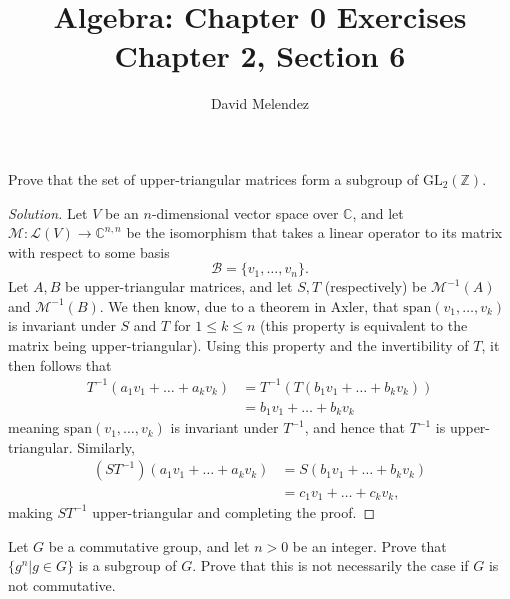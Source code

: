 \documentclass[12pt]{article}
\newenvironment{problem}[2][Problem]{\begin{trivlist}
\item[\hskip \labelsep {\bfseries #1}\hskip \labelsep {\bfseries #2.}]}{\end{trivlist}}
\newenvironment{solution}
  {\renewcommand\qedsymbol{$\blacksquare$}\begin{proof}[Solution]}
{\end{proof}}
\begin{document}
\title{Algebra: Chapter 0 Exercises\\ \large Chapter 2, Section 6}
\author{David Melendez}
\maketitle

\begin{problem}{6.2}
  Prove that the set of upper-triangular matrices form a subgroup of $\text{GL}_2(\mathbb{Z})$.
\end{problem}
\begin{solution}
  Let $V$ be an $n$-dimensional vector space over $\mathbb{C}$, 
  and let $\mathcal{M} : \mathcal{L}(V)\to \mathbb{C}^{n,n}$ be the isomorphism that takes a linear
  operator to its matrix with respect to some basis $$\mathcal{B}=\{v_1,\dots,v_n\}.$$
  Let $A, B$ be upper-triangular matrices, and let $S,T$ (respectively) be $\mathcal{M}^{-1}(A)$ and
  $\mathcal{M}^{-1}(B)$. 
  We then know, due to a theorem in Axler, that $\text{span}(v_1,\dots,v_k)$ is invariant under
  $S$ and $T$ for $1\leq k\leq n$ (this property is equivalent to the matrix being upper-triangular). 
  Using this property and the invertibility of $T$, it then follows that
  \begin{align*}
    T^{-1}(a_1v_1+\dots+a_kv_k) &= T^{-1}(T(b_1v_1+\dots+b_kv_k)) \\
    &= b_1v_1 + \dots + b_kv_k
  \end{align*}
  meaning $\text{span}(v_1,\dots,v_k)$ is invariant under $T^{-1}$, and hence that $T^{-1}$ 
  is upper-triangular.
  Similarly, 
  \begin{align*}
    (ST^{-1})(a_1v_1+\dots+a_kv_k) &= S(b_1v_1+\dots+b_kv_k) \\
    &= c_1v_1 + \dots + c_kv_k,
  \end{align*}
  making $ST^{-1}$ upper-triangular and completing the proof.
\end{solution}
\begin{problem}{6.4}
  Let $G$ be a commutative group, and let $n>0$ be an integer.
  Prove that $\{g^n | g \in G\}$ is a subgroup of $G$.
  Prove that this is not necessarily the case if $G$ is not commutative.
\end{problem}
\end{document}
